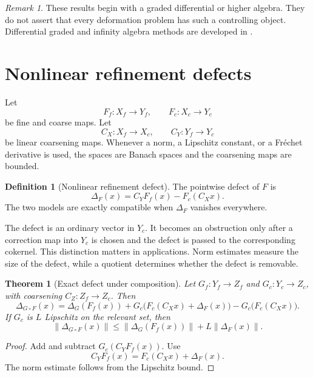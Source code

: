 \documentclass{aomart}
\newtheorem{theorem}{Theorem}[section]
\theoremstyle{definition}
\newtheorem{definition}[definition]{Definition}
\theoremstyle{remark}
\newtheorem{remark}[remark]{Remark}
\begin{document}
\begin{remark}\label{rem:graded_boundary}
These results begin with a graded differential or higher algebra.  They do not assert that every deformation problem has such a controlling object.  Differential graded and infinity algebra methods are developed in \cite{LodayVallette2012}.
\end{remark}

\section{Nonlinear refinement defects}\label{sec:nonlinear_defects}

Let
\[
F_f:X_f\longrightarrow Y_f,
\qquad
F_c:X_c\longrightarrow Y_c
\]
be fine and coarse maps.  Let
\[
C_X:X_f\longrightarrow X_c,
\qquad
C_Y:Y_f\longrightarrow Y_c
\]
be linear coarsening maps.  Whenever a norm, a Lipschitz constant, or a Fr\'echet derivative is used, the spaces are Banach spaces and the coarsening maps are bounded.

\begin{definition}[Nonlinear refinement defect]\label{def:nonlinear_defect}
The pointwise defect of $F$ is
\[
\Delta_F(x)
=
C_YF_f(x)-F_c(C_Xx).
\]
The two models are exactly compatible when $\Delta_F$ vanishes everywhere.
\end{definition}


The defect is an ordinary vector in $Y_c$.  It becomes an obstruction only after a correction map into $Y_c$ is chosen and the defect is passed to the corresponding cokernel.  This distinction matters in applications.  Norm estimates measure the size of the defect, while a quotient determines whether the defect is removable.

\begin{theorem}[Exact defect under composition]\label{thm:defect_composition_identity}
Let $G_f:Y_f\to Z_f$ and $G_c:Y_c\to Z_c$, with coarsening $C_Z:Z_f\to Z_c$.  Then
\[
\Delta_{G\circ F}(x)
=
\Delta_G(F_f(x))
+
G_c\big(F_c(C_Xx)+\Delta_F(x)\big)
-
G_c\big(F_c(C_Xx)\big).
\]
If $G_c$ is $L$ Lipschitz on the relevant set, then
\[
\|\Delta_{G\circ F}(x)\|
\le
\|\Delta_G(F_f(x))\|
+
L\|\Delta_F(x)\|.
\]
\end{theorem}

\begin{proof}
Add and subtract $G_c(C_YF_f(x))$.  Use
\[
C_YF_f(x)=F_c(C_Xx)+\Delta_F(x).
\]
The norm estimate follows from the Lipschitz bound.
\end{proof}
\end{document}
